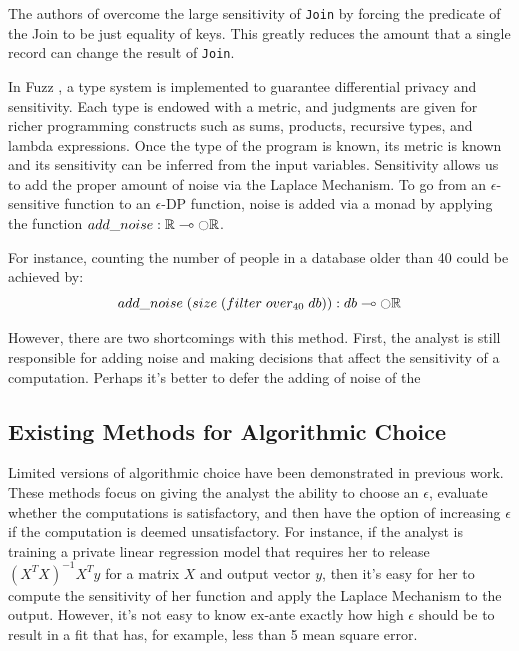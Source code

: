 \documentclass[11pt]{article}
\begin{document}
The authors of \cite{Johnson:2017} overcome the large sensitivity of \texttt{Join} by forcing the predicate of the Join to be just equality of keys. This greatly reduces the amount that a single record can change the result of \texttt{Join}.

In Fuzz \cite{Reed:2010}, a type system is implemented to guarantee differential privacy and sensitivity. Each type is endowed with a metric, and judgments are given for richer programming constructs such as sums, products, recursive types, and lambda expressions. Once the type of the program is known, its metric is known and its sensitivity can be inferred from the input variables. Sensitivity allows us to add the proper amount of noise via the Laplace Mechanism. To go from an $\epsilon$-sensitive function to an $\epsilon$-DP function, noise is added via a monad by applying the function $add\_noise : \mathbb{R} \multimap \fullmoon\mathbb{R}$.

For instance, counting the number of people in a database older than 40 could be achieved by:
\[
add\_noise\;(size\;(filter\;over_{40}\;db)) : db \multimap \fullmoon\mathbb{R}
\]

However, there are two shortcomings with this method. First, the analyst is still responsible for adding noise and making decisions that affect the sensitivity of a computation. Perhaps it's better to defer the adding of noise of the 
\subsection{Existing Methods for Algorithmic Choice}

Limited versions of algorithmic choice have been demonstrated in previous work. These methods focus on giving the analyst the ability to choose an $\epsilon$, evaluate whether the computations is satisfactory, and then have the option of increasing $\epsilon$ if the computation is deemed unsatisfactory.
For instance, if the analyst is training a private linear regression model that requires her to release $(X^TX)^{-1}X^Ty$ for a matrix $X$ and output vector $y$, then it's easy for her to compute the sensitivity of her function and apply the Laplace Mechanism to the output. However, it's not easy to know ex-ante exactly how high $\epsilon$ should be to result in a fit that has, for example, less than 5 mean square error.
\end{document}
